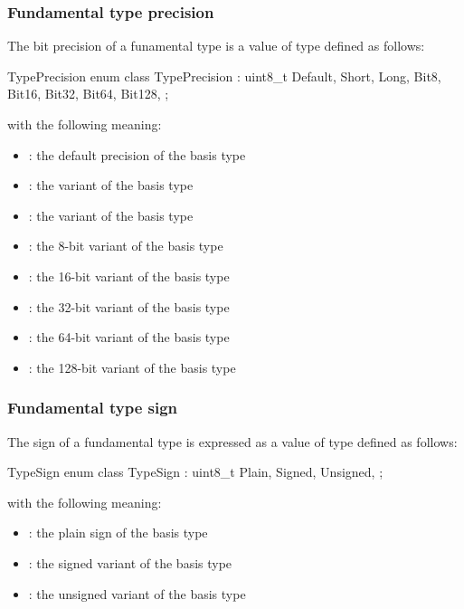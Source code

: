 
\subsubsection{Fundamental type precision}
\label{sec:ifc-fundamental-type-precision}

The bit precision of a funamental type is a value of type  defined as follows:
%
\begin{typedef}{TypePrecision}{}
	enum class TypePrecision : uint8_t {
		Default,
		Short,
		Long,
		Bit8,
		Bit16,
		Bit32,
		Bit64,
		Bit128,
	};
\end{typedef}
%
with the following meaning:
\begin{itemize}
  \item {}: the default precision of the basis type
  \item {}: the  variant of the basis type
  \item {}: the  variant of the basis type
  \item {}: the 8-bit variant of the basis type
  \item {}: the 16-bit variant of the basis type
  \item {}: the 32-bit variant of the basis type
  \item {}: the 64-bit variant of the basis type
  \item {}: the 128-bit variant of the basis type
\end{itemize}


\subsubsection{Fundamental type sign}
\label{sec:ifc-fundamental-type-sign}
The sign of a fundamental type is expressed as a value of type  defined as follows:
%
\begin{typedef}{TypeSign}{}
	enum class TypeSign : uint8_t {
		Plain,
		Signed,
		Unsigned,
	};
\end{typedef}
%
with the following meaning:
\begin{itemize}
  \item {}: the plain sign of the basis type
  \item {}: the signed variant of the basis type
  \item {}: the unsigned variant of the basis type
\end{itemize}



